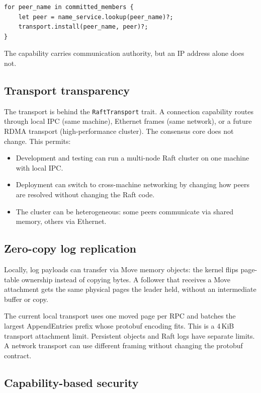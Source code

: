 \begin{lstlisting}[style=rustCode]
for peer_name in committed_members {
    let peer = name_service.lookup(peer_name)?;
    transport.install(peer_name, peer)?;
}
\end{lstlisting}

The capability carries communication authority, but an IP address alone does not.

\subsection{Transport transparency}

The transport is behind the \texttt{RaftTransport} trait. A connection capability
routes through local IPC (same machine), Ethernet frames (same network), or a
future RDMA transport (high-performance cluster). The consensus core does not
change. This permits:

\begin{itemize}
    \item Development and testing can run a multi-node Raft cluster on one
        machine with local IPC.
    \item Deployment can switch to cross-machine networking by changing how
        peers are resolved without changing the Raft code.
    \item The cluster can be heterogeneous: some peers communicate via shared
        memory, others via Ethernet.
\end{itemize}

\subsection{Zero-copy log replication}

Locally, log payloads can transfer via Move memory objects: the kernel flips
page-table ownership instead of copying bytes. A follower that receives a Move
attachment gets the same physical pages the leader held, without an intermediate
buffer or copy.

The current local transport uses one moved page per RPC and batches the largest
AppendEntries prefix whose protobuf encoding fits. This is a 4\,KiB transport
attachment limit. Persistent objects and Raft logs have separate limits. A network
transport can use different framing without changing the protobuf contract.

\subsection{Capability-based security}

